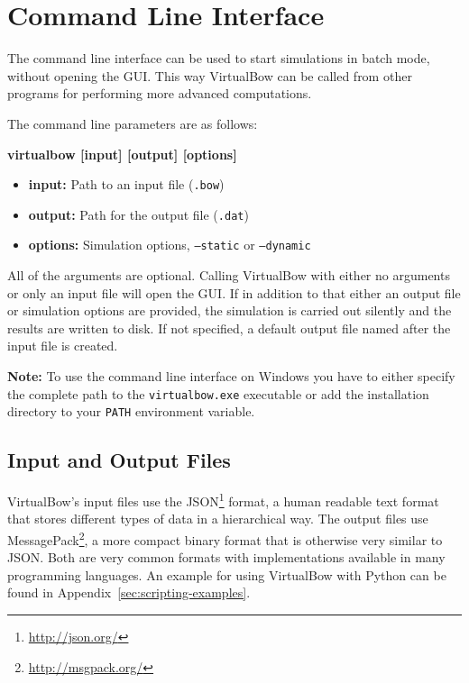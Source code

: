 \documentclass[12pt]{article}
\begin{document}
\newpage
\section{Command Line Interface}

The command line interface can be used to start simulations in batch mode, without opening the GUI.
This way VirtualBow can be called from other programs for performing more advanced computations.

The command line parameters are as follows:

\smallskip

\begin{framed}
\textbf{virtualbow [input] [output] [options]}
\end{framed}

\begin{itemize}
\item \textbf{input:} Path to an input file (\texttt{.bow})
\item \textbf{output:} Path for the output file (\texttt{.dat})
\item \textbf{options:} Simulation options, \texttt{--static} or \texttt{--dynamic}
\end{itemize}

\smallskip

All of the arguments are optional.
Calling VirtualBow with either no arguments or only an input file will open the GUI.
If in addition to that either an output file or simulation options are provided, the simulation is carried out silently and the results are written to disk.
If not specified, a default output file named after the input file is created.

\textbf{Note:} To use the command line interface on Windows you have to either specify the complete path to the \texttt{virtualbow.exe} executable or add the installation directory to your \texttt{PATH} environment variable.

\subsection*{Input and Output Files}

VirtualBow's input files use the JSON\footnote{\url{http://json.org/}} format, a human readable text format that stores different types of data in a hierarchical way.
The output files use MessagePack\footnote{\url{http://msgpack.org/}}, a more compact binary format that is otherwise very similar to JSON.
Both are very common formats with implementations available in many programming languages.
An example for using VirtualBow with Python can be found in Appendix~\ref{sec:scripting-examples}.
\end{document}
